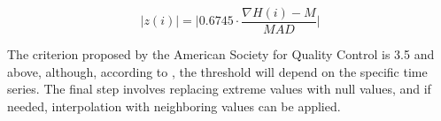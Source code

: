 \documentclass[12pt]{article}
\begin{document}
\begin{equation}
	\lvert z(i)\rvert = \bigg| 0.6745 \cdot \frac{\nabla H(i) - M}{MAD}\bigg|
\end{equation}

The criterion proposed by the American Society for Quality Control is 3.5 and above, although, according to \cite{removing_with_Whitaker-Hayes}, the threshold will depend on the specific time series. The final step involves replacing extreme values with null values, and if needed, interpolation with neighboring values can be applied.







\label{S.5}

\clearpage
\renewcommand\refname{References}







\end{document}
